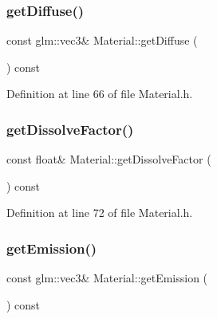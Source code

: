 \mbox{\label{class_material_a6d7a33e9240d886dd6e62782e380f05e}} 
\subsubsection{\texorpdfstring{get\+Diffuse()}{getDiffuse()}}
{\footnotesize\ttfamily const glm\+::vec3\& Material\+::get\+Diffuse (\begin{DoxyParamCaption}{ }\end{DoxyParamCaption}) const\hspace{0.3cm}{\ttfamily [inline]}}



Definition at line 66 of file Material.\+h.

\mbox{\label{class_material_ae615c797e56c8ad228888e8f21fd8223}} 
\subsubsection{\texorpdfstring{get\+Dissolve\+Factor()}{getDissolveFactor()}}
{\footnotesize\ttfamily const float\& Material\+::get\+Dissolve\+Factor (\begin{DoxyParamCaption}{ }\end{DoxyParamCaption}) const\hspace{0.3cm}{\ttfamily [inline]}}



Definition at line 72 of file Material.\+h.

\mbox{\label{class_material_a3c58519af3fdbf5bc3f5a6e1712d8fc6}} 
\subsubsection{\texorpdfstring{get\+Emission()}{getEmission()}}
{\footnotesize\ttfamily const glm\+::vec3\& Material\+::get\+Emission (\begin{DoxyParamCaption}{ }\end{DoxyParamCaption}) const\hspace{0.3cm}{\ttfamily [inline]}}



